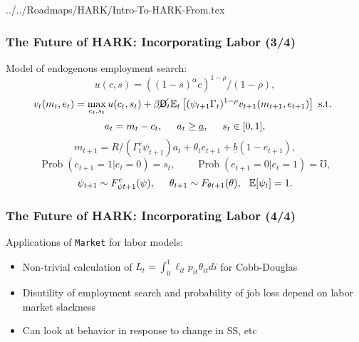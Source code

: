 \documentclass[public]{beamer}\beamerdefaultoverlayspecification{<+->}
\newcommand{\Prob}{\operatorname{Prob}}
\begin{document}
\begin{verbatimwrite}{../../Roadmaps/HARK/Intro-To-HARK-From.tex}
  \begin{frame}
    \frametitle{The Future of HARK: Incorporating Labor (3/4)}
    Model of endogenous employment search:
    \begin{equation*}
      u(c,s) = ((1-s)^\alpha c)^{1-\rho}/(1-\rho),
    \end{equation*}
    \begin{equation*}
      v_t(m_t,e_t) = \max_{c_t,s_t} u(c_t,s_t) + \beta \cancel{\mathsf{D}}_t \mathbb{E}_t \left[(\psi_{t+1} \Gamma_t)^{1-\rho} v_{t+1}(m_{t+1},e_{t+1}) \right] \text{ s.t. }
    \end{equation*}
    \begin{equation*}
      a_t = m_t - c_t, \hspace{0.5cm} a_t \geq \underline{a}, \hspace{0.5cm} s_t \in [0,1],
    \end{equation*}
    \begin{equation*}
      m_{t+1} = R/(\Gamma^e_t \psi_{t+1}) a_t + \theta_t e_{t+1} + \underline{b}(1-e_{t+1}), 
    \end{equation*}
    \begin{equation*}
      \Prob(e_{t+1} = 1 | e_t = 0) = s_t, \qquad \Prob(e_{t+1} = 0 | e_t = 1) = \mho,
    \end{equation*}
    \begin{equation*}
      \psi_{t+1} \sim F^e_{\psi t+1}(\psi), \hspace{0.5cm} \theta_{t+1} \sim F_{\theta t+1}(\theta), \hspace{0.25cm} \mathbb{E}[\psi_t] = 1.
    \end{equation*}
  \end{frame}



  \begin{frame}
    \frametitle{The Future of HARK: Incorporating Labor (4/4)}
    Applications of \texttt{Market} for labor models:
    \begin{itemize}
    \item Non-trivial calculation of $L_t = \int_0^1 \ell_{it} p_{it} \theta_{it} di$ for Cobb-Douglas

    \item Disutility of employment search and probability of job loss depend on labor market slackness

    \item Can look at behavior in response to change in SS, etc
    \end{itemize}


\end{frame}
\end{verbatimwrite}
\end{document}
